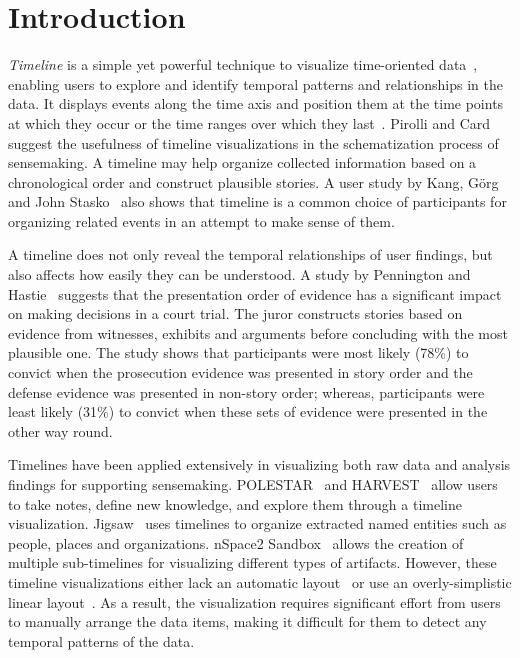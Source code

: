 \section{Introduction}

\emph{Timeline} is a simple yet powerful technique to visualize time-oriented data~\cite{Tufte1983}, enabling users to explore and identify temporal patterns and relationships in the data. It displays events along the time axis and position them at the time points at which they occur or the time ranges over which they last~\cite{Plaisant1996}. Pirolli and Card~\cite{Pirolli2005} suggest the usefulness of timeline visualizations in the schematization process of sensemaking. A timeline may help  organize collected information based on a chronological order and construct plausible stories. A user study by Kang, Görg and John Stasko~\cite{Kang2011} also shows that timeline is a common choice of participants for organizing related events in an attempt to make sense of them.

A timeline does not only reveal the temporal relationships of user findings, but also affects how easily they can be understood. A study by Pennington and Hastie~\cite{Pennington1991} suggests that the presentation order of evidence has a significant impact on making decisions in a court trial. The juror constructs stories based on evidence from witnesses, exhibits and arguments before concluding with the most plausible one. The study shows that participants were most likely (78\%) to convict when the prosecution evidence was presented in story order and the defense evidence was presented in non-story order; whereas, participants were least likely (31\%) to convict when these sets of evidence were presented in the other way round.

Timelines have been applied extensively in visualizing both raw data and analysis findings for supporting sensemaking. POLESTAR~\cite{Pioch2006} and HARVEST~\cite{Gotz2006} allow users to take notes, define new knowledge, and explore them through a timeline visualization. Jigsaw~\cite{Gorg2013} uses timelines to organize extracted named entities such as people, places and organizations. nSpace2 Sandbox~\cite{SandboxTimeline2012} allows the creation of multiple sub-timelines for visualizing different types of artifacts. However, these timeline visualizations either lack an automatic layout~\cite{Pioch2006} or use an overly-simplistic linear layout~\cite{SandboxTimeline2012}. As a result, the visualization requires significant effort from users to manually arrange the data items, making it difficult for them to detect any temporal patterns of the data.

